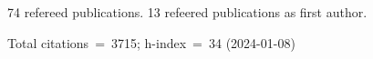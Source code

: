 74 refereed publications. 13 refeered publications as first author.

Total citations~=~3715; h-index~=~34 (2024-01-08)